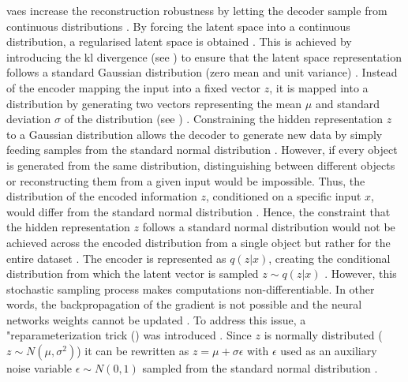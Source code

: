 \glspl{vae} increase the reconstruction robustness by letting the decoder sample from continuous distributions \cite{kingma2013AutoEncodingVariationalBayes}.
By forcing the latent space into a continuous distribution, a regularised latent space is obtained \cite{rocca2019UnderstandingVariationalAutoencoders}.
This is achieved by introducing the \gls{kl} divergence (see ) to ensure that the latent space representation follows a standard Gaussian distribution (zero mean and unit variance) \cite{razghandi2022VariationalAutoencoderGenerativea, aggarwal2018NeuralNetworksDeep}.
Instead of the encoder mapping the input into a fixed vector $z$, it is mapped into a distribution by generating two vectors representing the mean $\mu$ and standard deviation $\sigma$ of the distribution (see ) \cite{razghandi2022VariationalAutoencoderGenerativea, aggarwal2018NeuralNetworksDeep}.
Constraining the hidden representation $z$ to a Gaussian distribution allows the decoder to generate new data by simply feeding samples from the standard normal distribution \cite{aggarwal2018NeuralNetworksDeep}.
However, if every object is generated from the same distribution, distinguishing between different objects or reconstructing them from a given input would be impossible.
Thus, the distribution of the encoded information $z$, conditioned on a specific input $x$, would differ from the standard normal distribution \cite{aggarwal2018NeuralNetworksDeep}. %
Hence, the constraint that the hidden representation $z$ follows a standard normal distribution would not be achieved across the encoded distribution from a single object but rather for the entire dataset \cite{aggarwal2018NeuralNetworksDeep}.
The encoder is represented as $q(z|x)$, creating the conditional distribution from which the latent vector is sampled $z\sim q(z|x)$ \cite{kingma2013AutoEncodingVariationalBayes}.
However, this stochastic sampling process makes computations non-differentiable.
In other words, the backpropagation of the gradient is not possible and the neural networks weights cannot be updated \cite{aggarwal2018NeuralNetworksDeep}.
To address this issue, a "reparameterization trick () was introduced \cite[p. 4]{kingma2013AutoEncodingVariationalBayes}.
Since $z$ is normally distributed ($z\sim N(\mu,\sigma^2)$) it can be rewritten as $z=\mu+\sigma\epsilon$ with $\epsilon$ used as an auxiliary noise variable $\epsilon \sim N(0,1)$ sampled from the standard normal distribution \cite{kingma2013AutoEncodingVariationalBayes}.


